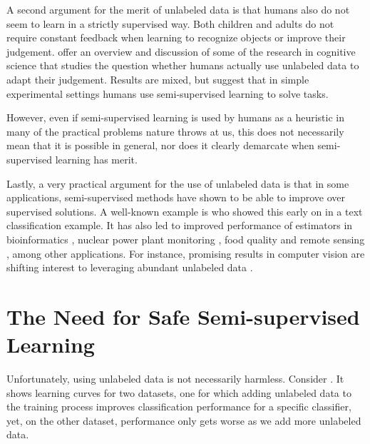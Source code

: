 \documentclass[twoside]{memoir}\usepackage[]{graphicx}\usepackage{xcolor}
\renewcommand{\cite}{\citep}
\begin{document}
A second argument for the merit of unlabeled data is that humans also do not seem to learn in a strictly supervised way. Both children and adults do not require constant feedback when learning to recognize objects or improve their judgement. \citet[Ch.7]{Zhu2009} offer an overview and discussion of some of the research in cognitive science that studies the question whether humans actually use unlabeled data to adapt their judgement. Results are mixed, but suggest that in simple experimental settings humans use semi-supervised learning to solve tasks. 

However, even if semi-supervised learning is used by humans as a heuristic in many of the practical problems nature throws at us, this does not necessarily mean that it is possible in general, nor does it clearly demarcate when semi-supervised learning has merit.

Lastly, a very practical argument for the use of unlabeled data is that in some applications, semi-supervised methods have shown to be able to improve over supervised solutions. A well-known example is \cite{Nigam2000} who showed this early on in a text classification example. It has also led to improved performance of estimators in bioinformatics \citep{Weston2005,Kall2007,Kasabov2003,Patel2015a}, nuclear power plant monitoring \citep{Ma2015,Moshkbar-bakhshayesh2016}, food quality \citep{Dean2006} and remote sensing \citep{Gomez-Chova2008}, among other applications. For instance, promising results in computer vision are shifting interest to leveraging abundant unlabeled data \cite{Rasmus2015}. 

\section{The Need for Safe Semi-supervised Learning}
Unfortunately, using unlabeled data is not necessarily harmless. Consider . It shows learning curves for two datasets, one for which adding unlabeled data to the training process improves classification performance for a specific classifier, yet, on the other dataset, performance only gets worse as we add more unlabeled data.
\end{document}
